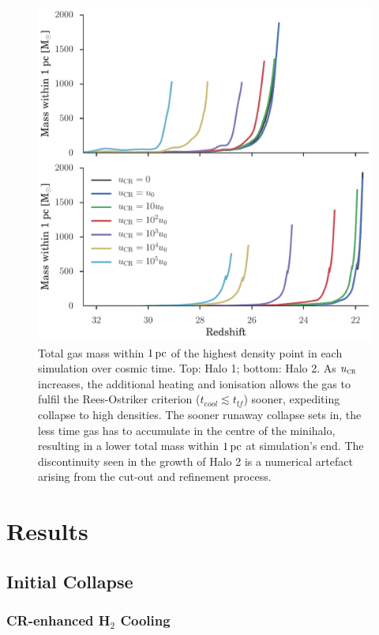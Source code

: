 \documentclass[../thesis.tex]{subfiles}
\begin{document}
\begin{figure}
\begin{center}
\includegraphics[width=.95\columnwidth]{figures/collapse/collapse}
\caption{\label{fig:collapse}
Total gas mass within $1\,\mathrm{pc}$ of the highest density point in each simulation over cosmic time.
Top: Halo 1; bottom: Halo 2.
As ${u}_{\textsc{cr}}$ increases, the additional heating and ionisation allows the gas to fulfil the Rees-Ostriker criterion ($t_{\mathrm cool} \lesssim t_{\mathrm ff}$) sooner, expediting collapse to high densities.  
The sooner runaway collapse sets in, the less time gas has to accumulate in the centre of the minihalo, resulting in a lower total mass within $1\,\mathrm{pc}$ at simulation's end.
The discontinuity seen in the growth of Halo 2 is a numerical artefact arising from the cut-out and refinement process.%
}
\end{center}
\end{figure}

\section{Results}
\label{sec:results}
\subsection{Initial Collapse}
\subsubsection{CR-enhanced H$_2$ Cooling}
\label{sec:initial_collapse}
\end{document}

